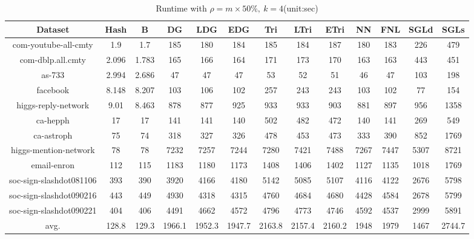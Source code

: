 \documentclass{sig-alternate-2013}
\begin{document}
\begin{table}[!hpp]
\centering
\caption{Runtime with $\rho = m\times 50\%,\ k=4$(unit:sec)}
\begin{tabular}{ccccccccccccc}
\hline
Dataset                 &Hash       &B          &DG         &LDG        &EDG        &Tri        &LTri       &ETri      &NN         &FNL        &SGLd   &SGLs\\
\hline
com-youtube-all-cmty	&1.9		&1.7		&185		&180		&184		&185		&184		&187		&180		&183		&226		&479\\
com-dblp.all.cmty		&2.096		&1.783		&165		&166		&164		&171		&173		&170		&163		&163		&443		&451\\
as-733		            &2.994		&2.686		&47		    &47		    &47		    &53  		&52		    &51		    &46		    &47	       	&103		&198\\
facebook		        &8.148		&8.207		&103		&106		&102		&257		&243		&243		&103		&102		&77	    	&154\\
higgs-reply-network		&9.01		&8.463		&878		&877		&925		&933		&933		&903		&881		&897		&956		&1358\\
ca-hepph		        &17		    &17  		&141		&141		&140		&502		&482		&472		&140		&141		&269		&549\\
ca-astroph		        &75		    &74	       	&318		&327		&326		&478		&453		&473		&333		&390		&852		&1769\\
higgs-mention-network	&78		    &78		    &7232		&7257		&7244		&7280		&7421		&7488		&7267		&7447		&5307		&8721\\
email-enron		        &112	    &115		&1183		&1180		&1173		&1408		&1406		&1402		&1127		&1135		&1018		&1769\\
soc-sign-slashdot081106	&393		&390		&3920		&4166		&4180		&5142		&5085		&5107		&4116		&4122		&2676		&5798\\
soc-sign-slashdot090216	&443		&449		&4930		&4318		&4315		&4760		&4684		&4680		&4428		&4584		&2678		&5799\\
soc-sign-slashdot090221	&404		&406		&4491		&4662		&4572		&4796		&4773		&4746		&4592		&4537		&2999		&5891\\
\hline
avg.                    &128.8  	&129.3	    &1966.1     &1952.3	    &1947.7	    &2163.8	    &2157.4	    &2160.2	    &1948	    &1979	    &1467	    &2744.7\\

\hline
\end{tabular}
\end{table}
\end{document}
